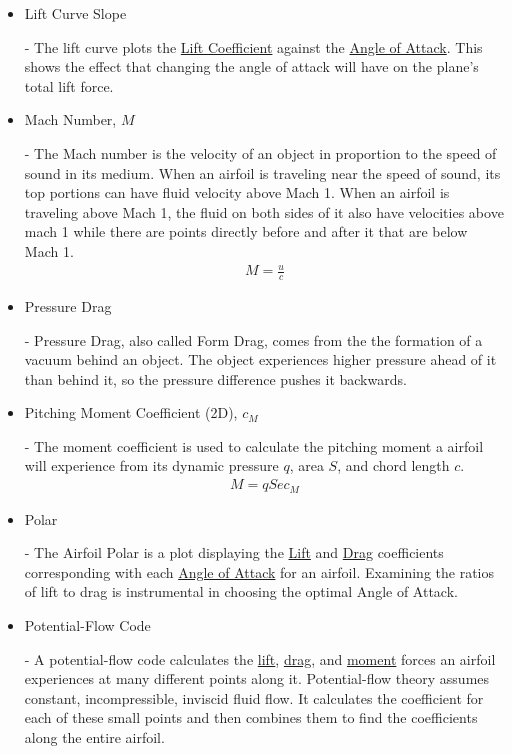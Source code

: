 \documentclass{article}
\begin{document}
\begin{itemize}
	\item \hypertarget{LC}{Lift Curve Slope} - The lift curve plots the \hyperlink{CL}{Lift Coefficient} against the \hyperlink{alpha}{Angle of Attack}. This shows the effect that changing the angle of attack will have on the plane's total lift force.
		
	\item \hypertarget{M}{Mach Number, $M$} - The Mach number is the velocity of an object in proportion to the speed of sound in its medium. When an airfoil is traveling near the speed of sound, its top portions can have fluid velocity above Mach 1. When an airfoil is traveling above Mach 1, the fluid on both sides of it also have velocities above mach 1 while there are points directly before and after it that are below Mach 1.
		\begin{equation} \label{eq:15}
		\begin{aligned}
        			M = \frac{u}{c}
	    	\end{aligned}
		\end{equation}
		
	\item \hypertarget{DP}{Pressure Drag} - Pressure Drag, also called Form Drag, comes from the the formation of a vacuum behind an object. The object experiences higher pressure ahead of it than behind it, so the pressure difference pushes it backwards.
		
	\item \hypertarget{CM}{Pitching Moment Coefficient (2D), $c_{M}$} - The moment coefficient is used to calculate the pitching moment a airfoil will experience from its dynamic pressure $q$, area $S$, and chord length $c$.
		\begin{equation} \label{eq:16}
		\begin{aligned}
        			M = q S e c_{M}
	    	\end{aligned}
		\end{equation}

	\item \hypertarget{AP}{Polar} - The Airfoil Polar is a plot displaying the  \hyperlink{CL}{Lift} and  \hyperlink{CD}{Drag} coefficients corresponding with each \hyperlink{alpha}{Angle of Attack} for an airfoil. Examining the ratios of lift to drag is instrumental in choosing the optimal Angle of Attack.
	
	\item \hypertarget{PFC}{Potential-Flow Code} - A potential-flow code calculates the \hyperlink{CL}{lift}, \hyperlink{CD}{drag}, and \hyperlink{CM}{moment} forces an airfoil experiences at many different points along it. Potential-flow theory assumes constant, incompressible, inviscid fluid flow. It calculates the coefficient for each of these small points and then combines them to find the coefficients along the entire airfoil.
	

\end{itemize}
\end{document}
